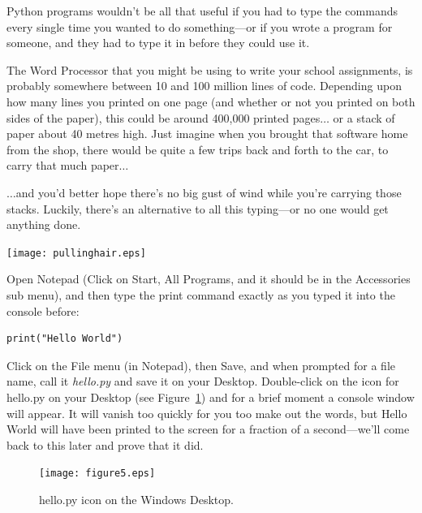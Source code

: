 Python programs wouldn't be all that useful if you had to type the commands every single time you wanted to do something---or if you wrote a program for someone, and they had to type it in before they could use it.

The Word Processor that you might be using to write your school assignments, is probably somewhere between 10 and 100 million lines of code.  Depending upon how many lines you printed on one page (and whether or not you printed on both sides of the paper), this could be around 400,000 printed pages$\ldots$ or a stack of paper about 40 metres high.
Just imagine when you brought that software home from the shop, there would be quite a few trips back and forth to the car, to carry that much paper$\ldots$

$\ldots$and you'd better hope there's no big gust of wind while you're carrying those stacks. Luckily, there's an alternative to all this typing---or no one would get anything done.

\begin{center}
\texttt{[image: pullinghair.eps]}
\end{center}

\begin{WINDOWS}
Open Notepad (Click on Start, All Programs, and it should be in the Accessories sub menu), and then type the print command exactly as you typed it into the console before:

\begin{listing}
\begin{verbatim}
print("Hello World")
\end{verbatim}
\end{listing}

Click on the File menu (in Notepad), then Save, and when prompted for a file name, call it \emph{hello.py} and save it on your Desktop. Double-click on the icon for hello.py on your Desktop (see Figure~\ref{fig5}) and for a brief moment a console window will appear.  It will vanish too quickly for you too make out the words, but Hello World will have been printed to the screen for a fraction of a second---we'll come back to this later and prove that it did.\\

\begin{figure}
\begin{center}
\texttt{[image: figure5.eps]}
\end{center}
\caption{hello.py icon on the Windows Desktop.}\label{fig5}
\end{figure}
\end{WINDOWS}

